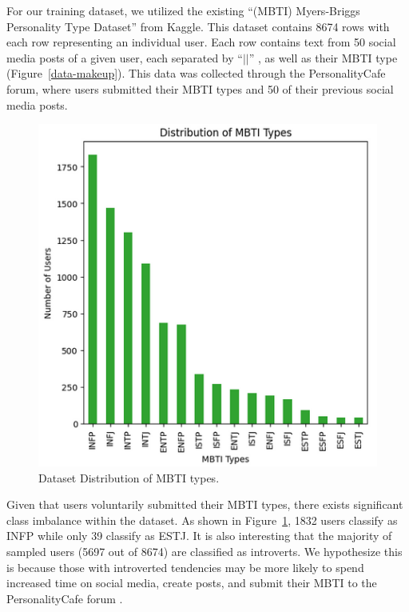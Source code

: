 \documentclass{article}
\begin{document}
For our training dataset, we utilized the existing “(MBTI) Myers-Briggs Personality Type Dataset” from Kaggle. This dataset contains 8674 rows with each row representing an individual user. Each row contains text from 50 social media posts of a given user, each separated by “$||$” , as well as their MBTI type (Figure~\ref{data-makeup}). This data was collected through the PersonalityCafe forum, where users submitted their MBTI types and 50 of their previous social media posts. 

\begin{figure}[ht]
\vskip 0.2in
\begin{center}
\centerline{\includegraphics[width=\columnwidth]{image4}}
\caption{Dataset Distribution of MBTI types.}
\label{type-dist}
\end{center}
\vskip -0.2in
\end{figure}

Given that users voluntarily submitted their MBTI types, there exists significant class imbalance within the dataset. As shown in Figure~\ref{type-dist}, 1832 users classify as INFP while only 39 classify as ESTJ. It is also interesting that the majority of sampled users (5697 out of 8674) are classified as introverts. We hypothesize this is because those with introverted tendencies may be more likely to spend increased time on social media, create posts, and submit their MBTI to the PersonalityCafe forum \cite{mitchell17}.
\end{document}
